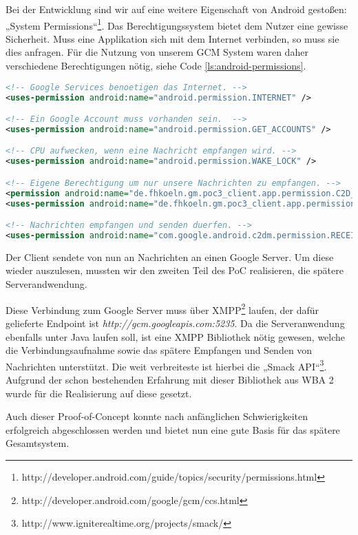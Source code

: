 Bei der Entwicklung sind wir auf eine weitere Eigenschaft von Android gestoßen: „System Permissions“\footnote{http://developer.android.com/guide/topics/security/permissions.html}. Das Berechtigungssystem bietet dem Nutzer eine gewisse Sicherheit. Muss eine Applikation sich mit dem Internet verbinden, so muss sie dies anfragen. Für die Nutzung von unserem GCM System waren daher verschiedene Berechtigungen nötig, siehe Code \ref{ls:android-permissions}.

\begin{lstlisting}[label=ls:android-permissions,caption=Meta-Tag für Google Play Services in AndroidManifest.xml,language=XML]
<!-- Google Services benoetigen das Internet. -->
<uses-permission android:name="android.permission.INTERNET" />

<!-- Ein Google Account muss vorhanden sein.  -->
<uses-permission android:name="android.permission.GET_ACCOUNTS" />

<!-- CPU aufwecken, wenn eine Nachricht empfangen wird. -->
<uses-permission android:name="android.permission.WAKE_LOCK" />

<!-- Eigene Berechtigung um nur unsere Nachrichten zu empfangen. -->
<permission android:name="de.fhkoeln.gm.poc3_client.app.permission.C2D_MESSAGE" android:protectionLevel="signature" />
<uses-permission android:name="de.fhkoeln.gm.poc3_client.app.permission.C2D_MESSAGE" />

<!-- Nachrichten empfangen und senden duerfen. -->
<uses-permission android:name="com.google.android.c2dm.permission.RECEIVE" />
\end{lstlisting}


Der Client sendete von nun an Nachrichten an einen Google Server. Um diese wieder auszulesen, mussten wir den zweiten Teil des PoC realisieren, die spätere Serverandwendung.

Diese Verbindung zum Google Server muss über XMPP\footnote{http://developer.android.com/google/gcm/ccs.html} laufen, der dafür gelieferte Endpoint ist \textit{http://gcm.googleapis.com:5235}. Da die Serveranwendung ebenfalls unter Java laufen soll, ist eine XMPP Bibliothek nötig gewesen, welche die Verbindungsaufnahme sowie das spätere Empfangen und Senden von Nachrichten unterstützt. Die weit verbreiteste ist hierbei die „Smack API“\footnote{http://www.igniterealtime.org/projects/smack/}. Aufgrund der schon bestehenden Erfahrung mit dieser Bibliothek aus WBA 2 wurde für die Realisierung auf diese gesetzt.

Auch dieser Proof-of-Concept konnte nach anfänglichen Schwierigkeiten erfolgreich abgeschlossen werden und bietet nun eine gute Basis für das spätere Gesamtsystem.

